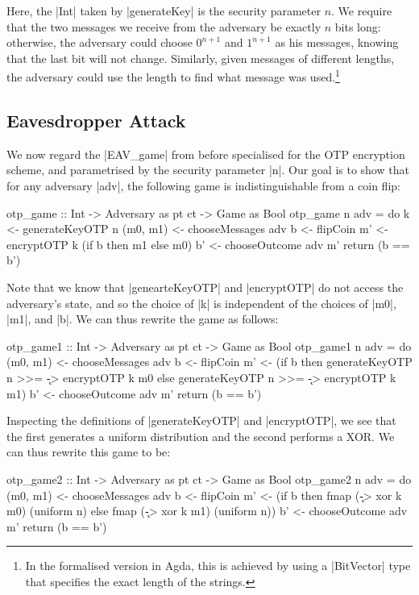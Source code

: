 Here, the |Int| taken by |generateKey| is the security parameter $n$.  We require that the two messages we receive from
the adversary be exactly $n$ bits long: otherwise, the adversary could choose $0^{n+1}$ and $1^{n+1}$ as his messages,
knowing that the last bit will not change.  Similarly, given messages of different lengths, the adversary could use the
length to find what message was used.\footnote{In the formalised version in Agda, this is achieved by using a
|BitVector| type that specifies the exact length of the strings.}

\subsection{Eavesdropper Attack}

We now regard the |EAV_game| from before specialised for the OTP encryption scheme, and parametrised by the security
parameter |n|.  Our goal is to show that for any adversary |adv|, the following game is indistinguishable from a coin
flip:
\begin{code}
otp_game :: Int -> Adversary as pt ct -> Game as Bool
otp_game n adv = do
    k <- generateKeyOTP n
    (m0, m1) <- chooseMessages adv
    b <- flipCoin
    m' <- encryptOTP k (if b then m1 else m0)
    b' <- chooseOutcome adv m'
    return (b == b')
\end{code}

Note that we know that |genearteKeyOTP| and |encryptOTP| do not access the adversary's state, and so the choice of |k| is
independent of the choices of |m0|, |m1|, and |b|.  We can thus rewrite the game as follows:
\begin{code}
otp_game1 :: Int -> Adversary as pt ct -> Game as Bool
otp_game1 n adv = do
    (m0, m1) <- chooseMessages adv
    b <- flipCoin
    m' <- (if b then generateKeyOTP n >>= \k -> encryptOTP k m0
                else generateKeyOTP n >>= \k -> encryptOTP k m1)
    b' <- chooseOutcome adv m'
    return (b == b')
\end{code}

Inspecting the definitions of |generateKeyOTP| and |encryptOTP|, we see that the first generates a uniform distribution
and the second performs a XOR.  We can thus rewrite this game to be:
\begin{code}
otp_game2 :: Int -> Adversary as pt ct -> Game as Bool
otp_game2 n adv = do
    (m0, m1) <- chooseMessages adv
    b <- flipCoin
    m' <- (if b then fmap (\k -> xor k m0) (uniform n)
                else fmap (\k -> xor k m1) (uniform n))
    b' <- chooseOutcome adv m'
    return (b == b')
\end{code}

